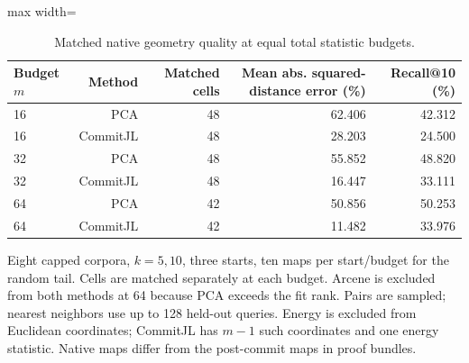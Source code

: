 \begin{table}[tp]
\caption{Matched native geometry quality at equal total statistic budgets.}\label{tab:geometry}
\centering\small
\begin{adjustbox}{max width=\textwidth}
\begin{tabular}{@{}lrrrr@{}}
\toprule
Budget $m$ & Method & Matched cells & Mean abs. squared-distance error (\%) & Recall@10 (\%) \\
\midrule
16 & PCA & 48 & 62.406 & 42.312 \\
16 & CommitJL & 48 & 28.203 & 24.500 \\
32 & PCA & 48 & 55.852 & 48.820 \\
32 & CommitJL & 48 & 16.447 & 33.111 \\
64 & PCA & 42 & 50.856 & 50.253 \\
64 & CommitJL & 42 & 11.482 & 33.976 \\
\bottomrule
\end{tabular}
\end{adjustbox}
\par\vspace{3pt}\begin{minipage}{0.98\textwidth}\footnotesize Eight capped corpora, $k=5,10$, three starts, ten maps per start/budget for the random tail. Cells are matched separately at each budget. Arcene is excluded from both methods at 64 because PCA exceeds the fit rank. Pairs are sampled; nearest neighbors use up to 128 held-out queries. Energy is excluded from Euclidean coordinates; CommitJL has $m-1$ such coordinates and one energy statistic. Native maps differ from the post-commit maps in proof bundles.\end{minipage}
\end{table}

